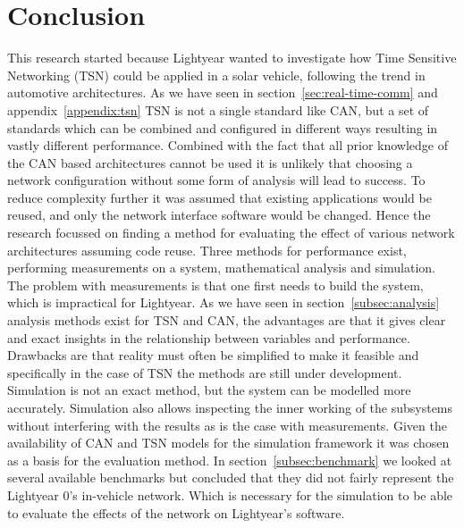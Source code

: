 \section{Conclusion}
\label{sec:conclusion}
This research started because Lightyear wanted to investigate how Time Sensitive Networking (TSN) could be applied in a solar vehicle, following the trend in automotive architectures. As we have seen in section~\ref{sec:real-time-comm} and appendix~\ref{appendix:tsn} TSN is not a single standard like CAN, but a set of standards which can be combined and configured in different ways resulting in vastly different performance. Combined with the fact that all prior knowledge of the CAN based architectures cannot be used it is unlikely that choosing a network configuration without some form of analysis will lead to success. To reduce complexity further it was assumed that existing applications would be reused, and only the network interface software would be changed. Hence the research focussed on finding a method for evaluating the effect of various network architectures assuming code reuse. Three methods for performance exist, performing measurements on a system, mathematical analysis and simulation. The problem with measurements is that one first needs to build the system, which is impractical for Lightyear. As we have seen in section~\ref{subsec:analysis} analysis methods exist for TSN and CAN, the advantages are that it gives clear and exact insights in the relationship between variables and performance. Drawbacks are that reality must often be simplified to make it feasible and specifically in the case of TSN the methods are still under development. Simulation is not an exact method, but the system can be modelled more accurately. Simulation also allows inspecting the inner working of the subsystems without interfering with the results as is the case with measurements. Given the availability of CAN and TSN models for the \omnet simulation framework it was chosen as a basis for the evaluation method. In section~\ref{subsec:benchmark} we looked at several available benchmarks but concluded that they did not fairly represent the Lightyear 0's in-vehicle network. Which is necessary for the simulation to be able to evaluate the effects of the network on Lightyear's software.

